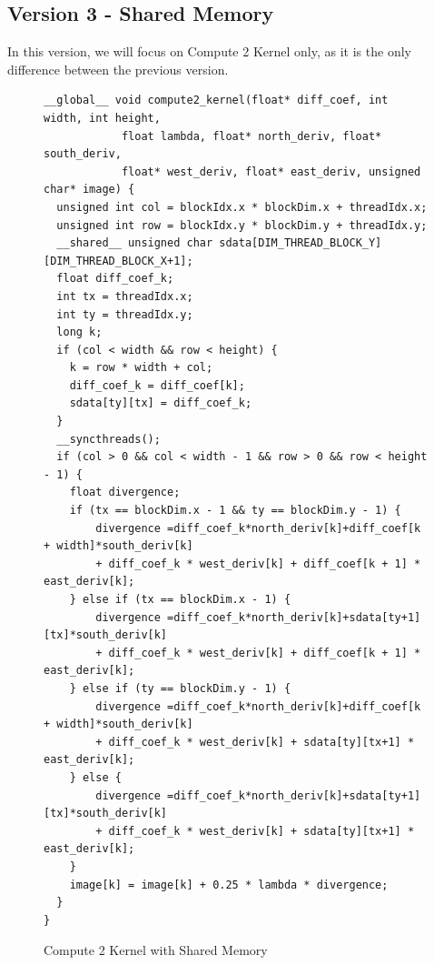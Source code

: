 \documentclass[12pt,reqno]{amsart}
\begin{document}
\subsection{Version 3 - Shared Memory}
In this version, we will focus on Compute 2 Kernel only, as it is the only difference between the previous version.
\begin{figure}[h]
\centering
\begin{lstlisting}
__global__ void compute2_kernel(float* diff_coef, int width, int height, 
            float lambda, float* north_deriv, float* south_deriv, 
            float* west_deriv, float* east_deriv, unsigned char* image) {
  unsigned int col = blockIdx.x * blockDim.x + threadIdx.x;
  unsigned int row = blockIdx.y * blockDim.y + threadIdx.y;
  __shared__ unsigned char sdata[DIM_THREAD_BLOCK_Y][DIM_THREAD_BLOCK_X+1];
  float diff_coef_k;
  int tx = threadIdx.x;
  int ty = threadIdx.y; 
  long k;
  if (col < width && row < height) {
    k = row * width + col; 
    diff_coef_k = diff_coef[k];
    sdata[ty][tx] = diff_coef_k;
  }
  __syncthreads();	
  if (col > 0 && col < width - 1 && row > 0 && row < height - 1) {
    float divergence;
    if (tx == blockDim.x - 1 && ty == blockDim.y - 1) {
        divergence =diff_coef_k*north_deriv[k]+diff_coef[k + width]*south_deriv[k] 
        + diff_coef_k * west_deriv[k] + diff_coef[k + 1] * east_deriv[k];
    } else if (tx == blockDim.x - 1) {
        divergence =diff_coef_k*north_deriv[k]+sdata[ty+1][tx]*south_deriv[k] 
        + diff_coef_k * west_deriv[k] + diff_coef[k + 1] * east_deriv[k];
    } else if (ty == blockDim.y - 1) {			
        divergence =diff_coef_k*north_deriv[k]+diff_coef[k + width]*south_deriv[k] 
        + diff_coef_k * west_deriv[k] + sdata[ty][tx+1] * east_deriv[k];
    } else {
        divergence =diff_coef_k*north_deriv[k]+sdata[ty+1][tx]*south_deriv[k] 
        + diff_coef_k * west_deriv[k] + sdata[ty][tx+1] * east_deriv[k];
    }
    image[k] = image[k] + 0.25 * lambda * divergence;
  }
}
\end{lstlisting}
\caption{Compute 2 Kernel with Shared Memory}
\label{fig:c2kernel_shared}
\end{figure}
\end{document}
